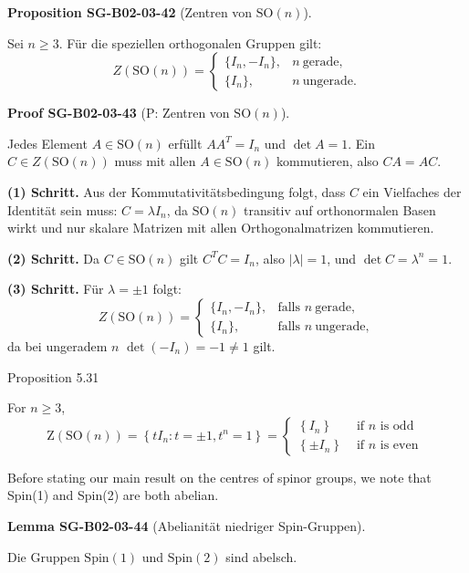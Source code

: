 \documentclass[10pt, letterpaper]{article}
\newcommand{\SO}{\mathrm{SO}}
\newcommand{\Spin}{\mathrm{Spin}}
\newcommand{\CustomHeading}[3]{%
  \par\medskip\noindent%
  \textbf{#1 #2} \textnormal{(#3)}.\enskip%
}
\newenvironment{PROP}[2]{\begin{unitbox}\CustomHeading{Proposition}{#1}{#2}}{\end{unitbox}}
\newenvironment{LEM}[2]{\begin{unitbox}\CustomHeading{Lemma}{#1}{#2}}{\end{unitbox}}
\newenvironment{PROOF}[2]{\begin{unitbox}\CustomHeading{Proof}{#1}{#2}}{\end{unitbox}}
\begin{document}
\begin{PROP}{SG-B02-03-42}{Zentren von $\SO(n)$}
Sei $n\geq 3$. Für die speziellen orthogonalen Gruppen gilt:
\[
Z(\SO(n))=
\begin{cases}
\{I_n,-I_n\}, & n\ \text{gerade},\\[4pt]
\{I_n\}, & n\ \text{ungerade}.
\end{cases}
\]
\end{PROP}




\begin{PROOF}{SG-B02-03-43}{P: Zentren von $\SO(n)$}
Jedes Element \(A\in\SO(n)\) erfüllt \(A A^T=I_n\) und \(\det A=1\).
Ein \(C\in Z(\SO(n))\) muss mit allen \(A\in\SO(n)\) kommutieren, also \(CA=AC\).

\smallskip
\textbf{(1) Schritt.}  
Aus der Kommutativitätsbedingung folgt, dass \(C\) ein Vielfaches der Identität sein muss:
\(C=\lambda I_n\), da \(\SO(n)\) transitiv auf orthonormalen Basen wirkt
und nur skalare Matrizen mit allen Orthogonalmatrizen kommutieren.

\smallskip
\textbf{(2) Schritt.}  
Da \(C\in\SO(n)\) gilt \(C^T C=I_n\), also \(|\lambda|=1\), und \(\det C=\lambda^n=1\).

\smallskip
\textbf{(3) Schritt.}  
Für \(\lambda=\pm1\) folgt:
\[
Z(\SO(n))=
\begin{cases}
\{I_n,-I_n\}, & \text{falls } n\ \text{gerade},\\[4pt]
\{I_n\}, & \text{falls } n\ \text{ungerade},
\end{cases}
\]
da bei ungeradem \(n\) \(\det(-I_n)=-1\neq1\) gilt.
\end{PROOF}




Proposition 5.31


For $n \geqslant 3$,
$$
\mathrm{Z}(\mathrm{SO}(n))=\left\{t I_{n}: t= \pm 1, t^{n}=1\right\}= \begin{cases}\left\{I_{n}\right\} & \text { if } n \text { is odd } \\ \left\{ \pm I_{n}\right\} & \text { if } n \text { is even }\end{cases}
$$


Before stating our main result on the centres of spinor groups, we note that Spin(1) and Spin(2) are both abelian.


\begin{LEM}{SG-B02-03-44}{Abelianität niedriger Spin-Gruppen}
Die Gruppen \(\Spin(1)\) und \(\Spin(2)\) sind abelsch.
\end{LEM}
\end{document}
